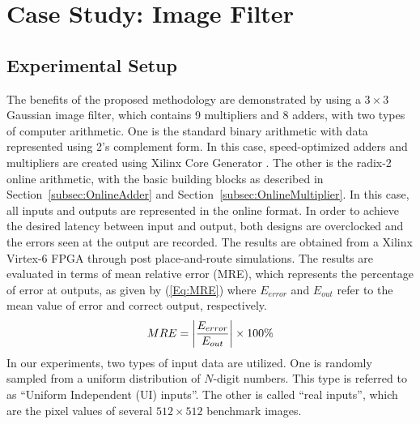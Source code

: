 \documentclass{acm_proc_article-sp}
\begin{document}
\section{Case Study: Image Filter}\label{Sec:CaseStudy}
\subsection{Experimental Setup}
The benefits of the proposed methodology are demonstrated by using a $3\times3$ Gaussian image filter, which contains 9 multipliers and 8 adders, with two types of computer arithmetic. One is the standard binary arithmetic with data represented using 2's complement form. In this case, speed-optimized adders and multipliers are created using Xilinx Core Generator \cite{XilinxMult}. The other is the radix-2 online arithmetic, with the basic building blocks as described in Section~\ref{subsec:OnlineAdder} and Section~\ref{subsec:OnlineMultiplier}. In this case, all inputs and outputs are represented in the online format. In order to achieve the desired latency between input and output, both designs are overclocked and the errors seen at the output are recorded. The results are obtained from a Xilinx Virtex-6 FPGA through post place-and-route simulations. The results are evaluated in terms of mean relative error (MRE), which represents the percentage of error at outputs, as given by (\ref{Eq:MRE}) where $E_{error}$ and $E_{out}$ refer to the mean value of error and correct output, respectively.
%
\begin{eqnarray}\label{Eq:MRE}
\scriptsize
  MRE=\left|\frac{E_{error}}{E_{out}}\right|\times100\%
\end{eqnarray}
\normalsize
%
In our experiments, two types of input data are utilized. One is randomly sampled from a uniform distribution of $N$-digit numbers. This type is referred to as ``Uniform Independent (UI) inputs''. The other is called ``real inputs'', which are the pixel values of several $512\times512$ benchmark images.

\vspace{-1ex}
\end{document}
